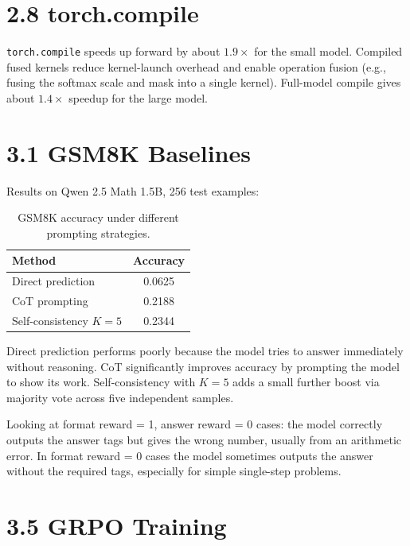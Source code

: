 \documentclass[11pt]{article}
\begin{document}
\section*{2.8 torch.compile}

\texttt{torch.compile} speeds up forward by about $1.9\times$ for the small
model.
Compiled fused kernels reduce kernel-launch overhead and enable operation
fusion (e.g., fusing the softmax scale and mask into a single kernel).
Full-model compile gives about $1.4\times$ speedup for the large model.

\section*{3.1 GSM8K Baselines}

Results on Qwen 2.5 Math 1.5B, 256 test examples:

\begin{table}[h]
\centering
\caption{GSM8K accuracy under different prompting strategies.}
\label{tab:gsm8k}
\begin{tabular}{lc}
\toprule
Method                        & Accuracy \\
\midrule
Direct prediction             & 0.0625   \\
CoT prompting                 & 0.2188   \\
Self-consistency $K=5$        & 0.2344   \\
\bottomrule
\end{tabular}
\end{table}

Direct prediction performs poorly because the model tries to answer
immediately without reasoning.
CoT significantly improves accuracy by prompting the model to show its work.
Self-consistency with $K=5$ adds a small further boost via majority vote
across five independent samples.

Looking at format reward = 1, answer reward = 0 cases: the model correctly
outputs the answer tags but gives the wrong number, usually from an arithmetic
error.
In format reward = 0 cases the model sometimes outputs the answer without the
required tags, especially for simple single-step problems.

\section*{3.5 GRPO Training}
\end{document}
